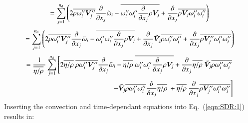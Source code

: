 \documentclass{warpdoc}
\newcommand{\alb}{\vspace{0.2cm}\\} %
\newcommand{\nd}{{{n}_{\rm d}}}
\newcommand{\mfd}{\displaystyle}
\begin{document}
%
\begin{displaymath}
  =\sum_{j=1}^{\nd} \left(
                             2 \overline{\rho \omega_i^{\prime\prime} \bm{V}_j^{\prime\prime}}
                                      \frac{\partial }{\partial x_j} {\wtilde{\omega}_i}
                          -  \overline{\omega_i^{\prime\prime} \omega_i^{\prime\prime} \frac{\partial }{\partial x_j} \rho \bm{V}_j}
                          +  \frac{\partial }{\partial x_j} \overline{\rho \bm{V}_j \omega_i^{\prime\prime} \omega_i^{\prime\prime}}
                     \right)
\end{displaymath}
%
\begin{displaymath}
  =\sum_{j=1}^{\nd} \left(
                              2 \overline{\rho \omega_i^{\prime\prime} \bm{V}_j^{\prime\prime}}
                                      \frac{\partial }{\partial x_j} {\wtilde{\omega}_i}
                          -  \overline{\omega_i^{\prime\prime} \omega_i^{\prime\prime} \frac{\partial }{\partial x_j} \rho \bm{V}_j}
                          +  \frac{\partial }{\partial x_j} {\wtilde{\bm{V}}_j} \overline{\rho \omega_i^{\prime\prime} \omega_i^{\prime\prime}}
                          +  \frac{\partial }{\partial x_j} \overline{\rho {\bm{V}_j^{\prime\prime}} \omega_i^{\prime\prime} \omega_i^{\prime\prime}}
                     \right)
\end{displaymath}
%
\begin{equation}
 \begin{array}{r}
  =\mfd\frac{1}{\overline{\eta/\rho}~}\sum_{j=1}^{\nd}
         \mfd\left[
           2 \overline{\eta/\rho}~ \overline{\rho \omega_i^{\prime\prime} \bm{V}_j^{\prime\prime}}
           \frac{\partial }{\partial x_j} {\wtilde{\omega}_i}
            -  \overline{\eta/\rho}~ \overline{\omega_i^{\prime\prime} \omega_i^{\prime\prime} \frac{\partial }{\partial x_j} \rho \bm{V}_j}
            +  \frac{\partial }{\partial x_j} \overline{\eta/\rho}~ {\wtilde{\bm{V}}_j} \overline{\rho \omega_i^{\prime\prime} \omega_i^{\prime\prime}}         \right.\alb
         \mfd\left.
            -  {\wtilde{\bm{V}}_j} \overline{\rho \omega_i^{\prime\prime} \omega_i^{\prime\prime}} \frac{\partial }{\partial x_j}  \overline{\eta/\rho}~
            +   \overline{\eta/\rho}~ \frac{\partial }{\partial x_j} \overline{\rho {\bm{V}_j^{\prime\prime}} \omega_i^{\prime\prime} \omega_i^{\prime\prime}}
         \right] 
 \end{array}
\label{eqn:SDR:convection}
\end{equation}
%
Inserting the convection and
time-dependant equations into Eq.\ (\ref{eqn:SDR:1}) results in:
\end{document}
